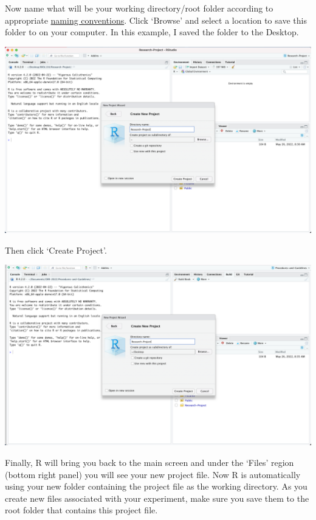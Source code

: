 \documentclass[
]{book}
\begin{document}
Now name what will be your working directory/root folder according to appropriate \href{https://ubco-biology.github.io/Procedures-and-Guidelines/directory-naming}{naming conventions}. Click `Browse' and select a location to save this folder to on your computer. In this example, I saved the folder to the Desktop.

\includegraphics{images/D_new-project-in-new-folder-4.png}

Then click `Create Project'.

\includegraphics{images/D_new-project-in-new-folder-5.png}

Finally, R will bring you back to the main screen and under the `Files' region (bottom right panel) you will see your new project file. Now R is automatically using your new folder containing the project file as the working directory. As you create new files associated with your experiment, make sure you save them to the root folder that contains this project file.
\end{document}
